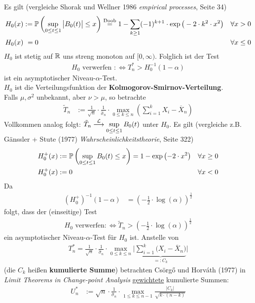 Es gilt (vergleiche Shorak und Wellner 1986 \textit{empirical processes}, Seite 34)
\begin{align*}
	H_0(x)&:=\P\left(\sup\limits_{0\leq t\leq 1}\big|B_0(t)\big|\leq x\right)
	\overset{\text{Doob}}{=}
	1-\sum\limits_{k\geq 1}(-1)^{k+1}\cdot\exp\big(-2\cdot k^2\cdot x^2\big)&\forall x>0\\
	H_0(x)&~=0 &\forall x\leq 0
\end{align*}
$H_0$ ist stetig auf $\R$ uns streng monoton auf $[0,\infty)$. 
Folglich ist der Test
\begin{align*}
	H_0\text{ verwerfen }:\Longleftrightarrow T_n^\ast>H_0^{-1}(1-\alpha)
\end{align*}
ist ein asymptotischer Niveau-$\alpha$-Test.\\
$H_0$ ist die Verteilungsfunktion der \textbf{Kolmogorov-Smirnov-Verteilung}.\\
Falls $\mu,\sigma^2$ unbekannt, aber $\nu>\mu$, so betrachte 
\begin{align*}
	\tilde{T}_n&:=\frac{1}{\sqrt{n}}\cdot\frac{1}{\hat{\sigma}_n}\cdot\max\limits_{0\leq k\leq n}\left(\sum\limits_{i=1}^kX_i-\overline{X}_n\right)
\end{align*}
Vollkommen analog folgt: $\tilde{T}_n\stackrel{\L}{\longrightarrow}\sup\limits_{0\leq t\leq 1} B_0(t)$ unter $H_0$. 
Es gilt (vergleiche z.B. Gänssler + Stute (1977) \textit{Wahrscheinlichkeitstheorie}, Seite 322)
\begin{align*}
	H_0^+(x)&:=\P\left(\sup\limits_{0\leq t\leq 1}B_0(t)\leq x\right)=1-\exp\left(-2\cdot x^2\right) &\forall x\geq0\\
	H_0^+(x)&:=0 &\forall x<0
\end{align*}
Da 
\begin{align*}
	(H_0^+)^{-1}(1-\alpha)&=\left(-\frac{1}{2}\cdot\log(\alpha)\right)^{\frac{1}{2}}
\end{align*}
folgt, dass der (einseitige) Test
\begin{align*}
	H_0\text{ verwerfen}:\Longleftrightarrow\tilde{T}_n>\left(-\frac{1}{2}\cdot\log(\alpha)\right)^{\frac{1}{2}}
\end{align*}
ein asymptotischer Niveau-$\alpha$-Test für $H_0$ ist.\nl
Anstelle von
\begin{align*}
	T_n^\ast=\frac{1}{\sqrt{n}}\cdot\frac{1}{\hat{\sigma}_n}\cdot\max\limits_{0\leq k \leq n}\bigg|\underbrace{\sum\limits_{i=1}^k\big(X_i-\overline{X}_n\big)}_{=:C_k}\bigg|
\end{align*}
(die $C_k$ heißen \textbf{kumulierte Summe}) betrachten Csörgő und Horváth (1977) in \textit{Limit Theorems in Change-point Analysis} \ul{gewichtete} kumulierte Summen:
\begin{align*}
	U_n^\ast&:=\sqrt{n}\cdot\frac{1}{\hat{\sigma}_n}\cdot\max\limits_{1\leq k\leq n-1}\frac{|C_k|}{\sqrt{k\cdot(n-k)}}
\end{align*}

